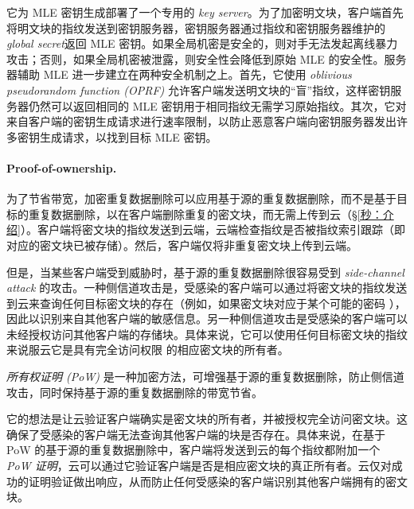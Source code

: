 它为 MLE 密钥生成部署了一个专用的 {\em key server}。为了加密明文块，客户端首先将明文块的指纹发送到密钥服务器，密钥服务器通过指纹和密钥服务器维护的{\em global secret}返回 MLE 密钥。如果全局机密是安全的，则对手无法发起离线暴力攻击；否则，如果全局机密被泄露，则安全性会降低到原始 MLE 的安全性。服务器辅助 MLE 进一步建立在两种安全机制之上。首先，它使用 {\em oblivious pseudorandom function (OPRF)} \cite{naor04} 允许客户端发送明文块的“盲”指纹，这样密钥服务器仍然可以返回相同的 MLE 密钥用于相同指纹无需学习原始指纹。其次，它对来自客户端的密钥生成请求进行速率限制，以防止恶意客户端向密钥服务器发出许多密钥生成请求，以找到目标 MLE 密钥。

\paragraph{Proof-of-ownership.} 为了节省带宽，加密重复数据删除可以应用基于源的重复数据删除，而不是基于目标的重复数据删除，以在客户端删除重复的密文块，而无需上传到云（\S\ref {秒：介绍}）。客户端将密文块的指纹发送到云端，云端检查指纹是否被指纹索引跟踪（即对应的密文块已被存储）。然后，客户端仅将非重复密文块上传到云端。


但是，当某些客户端受到威胁时，基于源的重复数据删除很容易受到 {\em side-channel attack} \cite{harnik10,halevi11} 的攻击。一种侧信道攻击是，受感染的客户端可以通过将密文块的指纹发送到云来查询任何目标密文块的存在（例如，如果密文块对应于某个可能的密码 \cite{harnik10}），因此以识别来自其​​他客户端的敏感信息。另一种侧信道攻击是受感染的客户端可以未经授权访问其他客户端的存储块。具体来说，它可以使用任何目标密文块的指纹来说服云它是具有完全访问权限 \cite{halevi11} 的相应密文块的所有者。


{\em 所有权证明 (PoW)} \cite{halevi11} 是一种加密方法，可增强基于源的重复数据删除，防止侧信道攻击，同时保持基于源的重复数据删除的带宽节省。

它的想法是让云验证客户端确实是密文块的所有者，并被授权完全访问密文块。这确保了受感染的客户端无法查询其他客户端的块是否存在。具体来说，在基于 PoW 的基于源的重复数据删除中，客户端将发送到云的每个指纹都附加一个 {\em PoW 证明}，云可以通过它验证客户端是否是相应密文块的真正所有者。云仅对成功的证明验证做出响应，从而防止任何受感染的客户端识别其他客户端拥有的密文块。 

